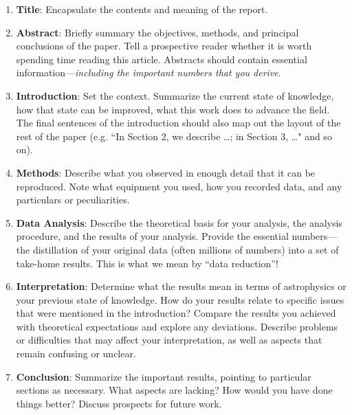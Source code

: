 \documentclass[12pt,preprint]{aastex}
\begin{document}
\begin{enumerate}

\item \textbf{Title}:  Encapsulate the contents and meaning of the report.

\item \textbf{Abstract}: Briefly summary  the objectives, methods, and principal conclusions of the paper.  Tell a prospective reader whether it is worth spending time reading this article. Abstracts should contain essential information---{\it including the important numbers that you derive}.
  
\item \textbf{Introduction}: Set the context. Summarize the current state of
  knowledge, how that state can be improved, what this work does to
  advance the field.  The final sentences of the introduction should also map out the layout of the rest of the paper (e.g. ``In Section 2, we describe \dots; in Section 3, \dots" and so on).

\item \textbf{Methods}: Describe what you observed in enough detail that it can be reproduced. Note what equipment you used, how you recorded data, and any particulars or peculiarities.

\item \textbf{Data Analysis}: Describe the theoretical basis for your analysis,
  the analysis procedure, and the results of your analysis. Provide
  the essential numbers---the distillation of your original data (often
  millions of numbers) into a set of take-home results. This is
  what we mean by ``data reduction''!

\item \textbf{Interpretation}: Determine what the results mean in terms of astrophysics or
  your previous state of knowledge. How do your results relate to specific
  issues that were mentioned in the introduction? Compare the results you achieved with theoretical expectations and explore any deviations. Describe problems or difficulties that may affect your interpretation, as well as aspects that remain confusing or unclear.
 
\item \textbf{Conclusion}: Summarize the important results, pointing to particular sections as necessary. What aspects are lacking? How would
  you have done things better? Discuss prospects for future work.
  

\end{enumerate}
\end{document}
